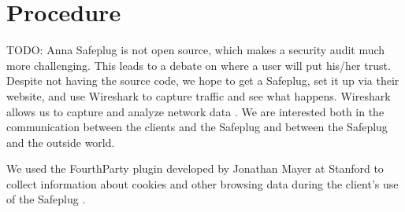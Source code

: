 \section{Procedure}
\label{sec:proc}
TODO: Anna
Safeplug is not open source, which makes a security audit much more challenging.  This leads to a debate on where a user will put his/her trust.  Despite not having the source code, we hope to get a Safeplug, set it up via their website, and use Wireshark to capture traffic and see what happens.  Wireshark allows us to capture and analyze network data \cite{wireshark}.  We are interested both in the communication between the clients and the Safeplug and between the Safeplug and the outside world. 

We used the FourthParty plugin developed by Jonathan Mayer at Stanford to collect information about cookies and other browsing data during the client's use of the Safeplug \cite{fourthparty}.
